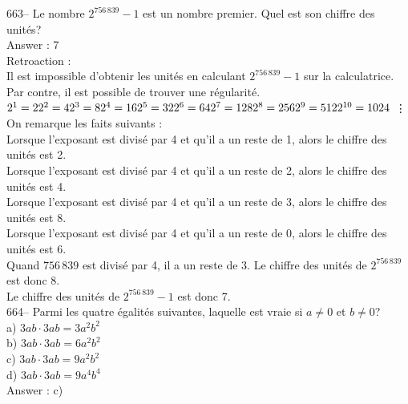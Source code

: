 ﻿\documentclass[letterpaper, 12pt]{article}
\begin{document}
663--  Le nombre $2^{756\,839}-1$ est un nombre premier.  Quel est son
chiffre des unit\'es?\\

Answer : 7\\

Retroaction : \\
Il est impossible d'obtenir les unit\'es en calculant $2^{756\,839}-1$ sur
la calculatrice.  Par contre, il est possible de trouver une r\'egularit\'e.
  \\
$2^{1}  = 2\\
2^{2}  = 4\\
2^{3}  = 8\\
2^{4} = 16\\
2^{5}  = 32\\
2^{6}  = 64\\
2^{7}  = 128\\
2^{8}= 256\\
2^{9}  = 512\\
2^{10} = 1024\\$ \vdots\\
On remarque les faits suivants :\\
Lorsque l'exposant est divis\'e par 4 et qu'il a un reste de 1, alors le
chiffre des unit\'es est 2.\\
Lorsque l'exposant est divis\'e par 4 et qu'il a un reste de 2, alors le
chiffre des unit\'es est 4.\\
Lorsque l'exposant est divis\'e par 4 et qu'il a un reste de 3, alors le
chiffre des unit\'es est 8.\\
Lorsque l'exposant est divis\'e par 4 et qu'il a un reste de 0, alors le
chiffre des unit\'es est 6.\\

Quand $756\,839$ est divis\'e par 4, il a un reste de 3.  Le chiffre des
unit\'es de $2^{756\,839}$ est donc 8.\\
Le chiffre des unit\'es de $2^{756\,839}-1$ est donc 7.  \\

664-- Parmi les quatre \'egalit\'es suivantes, laquelle est vraie si
$a\neq0$ et $b \neq 0$?\\
a) $3ab\cdot3ab=3a^{2}b^{2}$\\
b) $3ab\cdot3ab=6a^{2}b^{2}$\\
c) $3ab\cdot3ab=9a^{2}b^{2}$\\
d) $3ab\cdot3ab= 9a^{4}b^{4}$\\

Answer : c)\\
\end{document}
